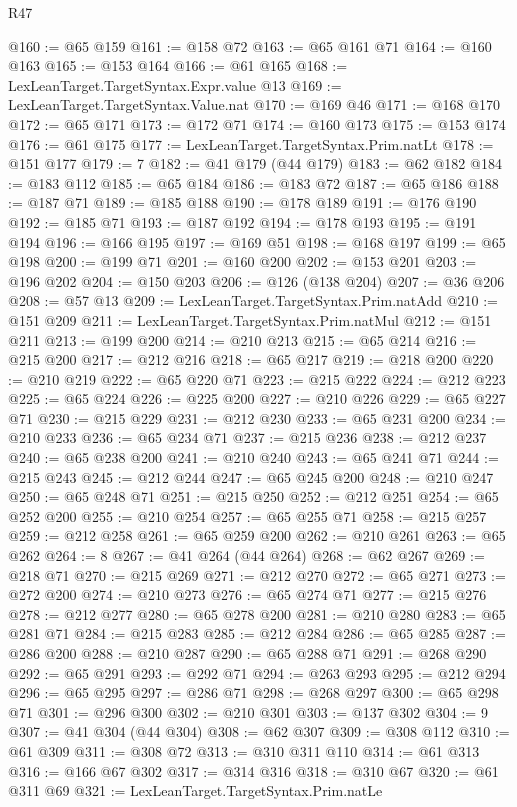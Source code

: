 \begin{lexlean}{R47}
\begin{coremodule}
@160 := @65 @159
@161 := @158 @72
@163 := @65 @161 @71
@164 := @160 @163
@165 := @153 @164
@166 := @61 @165
@168 := LexLeanTarget.TargetSyntax.Expr.value @13
@169 := LexLeanTarget.TargetSyntax.Value.nat
@170 := @169 @46
@171 := @168 @170
@172 := @65 @171
@173 := @172 @71
@174 := @160 @173
@175 := @153 @174
@176 := @61 @175
@177 := LexLeanTarget.TargetSyntax.Prim.natLt
@178 := @151 @177
@179 := 7
@182 := @41 @179 (@44 @179)
@183 := @62 @182
@184 := @183 @112
@185 := @65 @184
@186 := @183 @72
@187 := @65 @186
@188 := @187 @71
@189 := @185 @188
@190 := @178 @189
@191 := @176 @190
@192 := @185 @71
@193 := @187 @192
@194 := @178 @193
@195 := @191 @194
@196 := @166 @195
@197 := @169 @51
@198 := @168 @197
@199 := @65 @198
@200 := @199 @71
@201 := @160 @200
@202 := @153 @201
@203 := @196 @202
@204 := @150 @203
@206 := @126 (@138 @204)
@207 := @36 @206
@208 := @57 @13
@209 := LexLeanTarget.TargetSyntax.Prim.natAdd
@210 := @151 @209
@211 := LexLeanTarget.TargetSyntax.Prim.natMul
@212 := @151 @211
@213 := @199 @200
@214 := @210 @213
@215 := @65 @214
@216 := @215 @200
@217 := @212 @216
@218 := @65 @217
@219 := @218 @200
@220 := @210 @219
@222 := @65 @220 @71
@223 := @215 @222
@224 := @212 @223
@225 := @65 @224
@226 := @225 @200
@227 := @210 @226
@229 := @65 @227 @71
@230 := @215 @229
@231 := @212 @230
@233 := @65 @231 @200
@234 := @210 @233
@236 := @65 @234 @71
@237 := @215 @236
@238 := @212 @237
@240 := @65 @238 @200
@241 := @210 @240
@243 := @65 @241 @71
@244 := @215 @243
@245 := @212 @244
@247 := @65 @245 @200
@248 := @210 @247
@250 := @65 @248 @71
@251 := @215 @250
@252 := @212 @251
@254 := @65 @252 @200
@255 := @210 @254
@257 := @65 @255 @71
@258 := @215 @257
@259 := @212 @258
@261 := @65 @259 @200
@262 := @210 @261
@263 := @65 @262
@264 := 8
@267 := @41 @264 (@44 @264)
@268 := @62 @267
@269 := @218 @71
@270 := @215 @269
@271 := @212 @270
@272 := @65 @271
@273 := @272 @200
@274 := @210 @273
@276 := @65 @274 @71
@277 := @215 @276
@278 := @212 @277
@280 := @65 @278 @200
@281 := @210 @280
@283 := @65 @281 @71
@284 := @215 @283
@285 := @212 @284
@286 := @65 @285
@287 := @286 @200
@288 := @210 @287
@290 := @65 @288 @71
@291 := @268 @290
@292 := @65 @291
@293 := @292 @71
@294 := @263 @293
@295 := @212 @294
@296 := @65 @295
@297 := @286 @71
@298 := @268 @297
@300 := @65 @298 @71
@301 := @296 @300
@302 := @210 @301
@303 := @137 @302
@304 := 9
@307 := @41 @304 (@44 @304)
@308 := @62 @307
@309 := @308 @112
@310 := @61 @309
@311 := @308 @72
@313 := @310 @311 @110
@314 := @61 @313
@316 := @166 @67 @302
@317 := @314 @316
@318 := @310 @67
@320 := @61 @311 @69
@321 := LexLeanTarget.TargetSyntax.Prim.natLe

\end{coremodule}
\end{lexlean}
